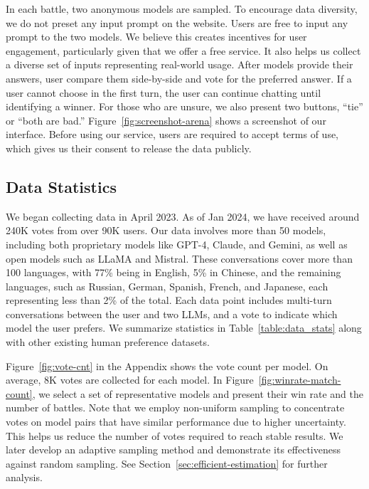 \documentclass{article}
\newcommand{\showcomments}{yes}
\newcommand\todo[1]{\ifthenelse{\equal{\showcomments}{yes}}{{\color{red} TODO: #1}}{\ignorespaces}}
\newcommand\joey[1]{\ifthenelse{\equal{\showcomments}{yes}}{{\color{blue} (Joey: #1)}}{\ignorespaces}}
\begin{document}
In each battle, two anonymous models are sampled. To encourage data diversity, we do not preset any input prompt on the website. Users are free to input any prompt to the two models. We believe this creates incentives for user engagement, particularly given that we offer a free service. It also helps us collect a diverse set of inputs representing real-world usage. After models provide their answers, user compare them side-by-side and vote for the preferred answer. If a user cannot choose in the first turn, the user can continue chatting until identifying a winner. For those who are unsure, we also present two buttons, ``tie'' or ``both are bad.'' Figure~\ref{fig:screenshot-arena} shows a screenshot of our interface.
Before using our service, users are required to accept terms of use, which gives us their consent to release the data publicly.

\subsection{Data Statistics}

We began collecting data in April 2023. As of Jan 2024, we have received around 240K votes from over 90K users. Our data involves more than 50 models, including both proprietary models like GPT-4, Claude, and Gemini, as well as open models such as LLaMA and Mistral.
These conversations cover more than 100 languages, with 77\% being in English, 5\% in Chinese, and the remaining languages, such as Russian, German, Spanish, French, and Japanese, each representing less than 2\% of the total.
Each data point includes multi-turn conversations between the user and two LLMs, and a vote to indicate which model the user prefers.
We summarize statistics in Table~\ref{table:data_stats} along with other existing human preference datasets.



Figure~\ref{fig:vote-cnt} in the Appendix shows the vote count per model. On average, 8K votes are collected for each model.
In Figure~\ref{fig:winrate-match-count}, we select a set of representative models and present their win rate and the number of battles. Note that we employ non-uniform sampling to concentrate votes on model pairs that have similar performance due to higher uncertainty. 
This helps us reduce the number of votes required to reach stable results. 
We later develop an adaptive sampling method and demonstrate its effectiveness against random sampling. See Section~\ref{sec:efficient-estimation} for further analysis.
\end{document}
